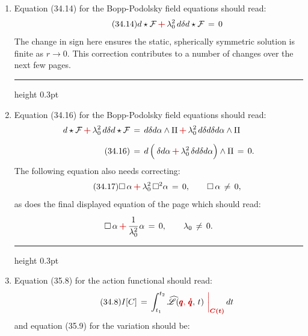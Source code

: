 \documentclass[12pt]{GeomPhysBOOK}
\newcommand\correct[1]{{\color{red!80!black}\bf #1}}
\newcommand\mcorrect[1]{{\color{red!80!black}\bm{#1}}}
\newcommand\listrule{\vspace{0.2cm}\hrule height 0.3pt}
\begin{document}
\begin{enumerate}[leftmargin=1.9cm,labelwidth=1.4cm,itemsep=0.5cm]
\begin{align}
			 \tag{30.180}	&  \qquad + (r^{*})^{2}\left( d\theta^{*}\tensor d\theta^{*} + \sin^{2}(\theta^{*})\,d\phi^{*}\tensor d\phi^{*}\right).
		\end{align}
		\vspace{-0.3cm}
	\listrule
	\item[\underline{page 659}:] 
		Equation (34.14) for the Bopp-Podolsky field equations should read:
		\begin{align}\tag{34.14}
			d\star \compF \,\mcorrect{+}\, \lambda_{0}^{2}\,d\delta d\star \compF \,=\, 0
		\end{align}
		The change in sign here ensures the static, spherically symmetric solution is finite as $r\rightarrow 0$.  This correction contributes to a number of changes over the next few pages. \\
	\listrule
	\item[\underline{page 660}:] 
		Equation (34.16) for the Bopp-Podolsky field equations should read:
		\begin{align}
			\nonumber d\star \compF \,\mcorrect{+}\, \lambda_{0}^{2}\,d\delta d\star \compF &\,=\, d\delta d\alpha \w \Pi \,\mcorrect{+}\, \lambda_{0}^{2}\,d \delta d\delta d\alpha \w \Pi \\[0.2cm]
			\tag{34.16}	&\,=\, d\left(\df\delta d\alpha  \,\mcorrect{+}\, \lambda_{0}^{2}\,\delta d\delta d\alpha\right) \w \Pi \,=\, 0.
		\end{align}
		The following equation also needs correcting:
		\begin{align}\tag{34.17}
			\Box\,\alpha \,\mcorrect{+}\, \lambda_{0}^{2}\,\Box^{2}\alpha \,=\, 0, \qquad \Box\,\alpha\,\neq\,0,
		\end{align}
		as does the final displayed equation of the page which should read:
		\begin{align*}
			\Box\,\alpha \,\mcorrect{+}\, \cfrac{1}{\lambda_{0}^{2}}\, \alpha \,=\, 0, \qquad \lambda_{0}\,\neq\, 0.
		\end{align*}		
	\listrule
	\item[\underline{page 688}:] 
		Equation (35.8) for the action functional should read:
		\begin{align}\tag{34.8}
			I[C] \,=\, \int_{t_{1}}^{t_{2}}\wh{\mathscr{L}}(\correct{\qq,\,\dot{\qq}},\, t)\mcorrect{\left.\df\right|_{C(t)}}\,dt
		\end{align}
		and equation (35.9) for the variation should be:
		\begin{align}\tag{34.9}

\end{align}
\end{enumerate}
\end{document}
